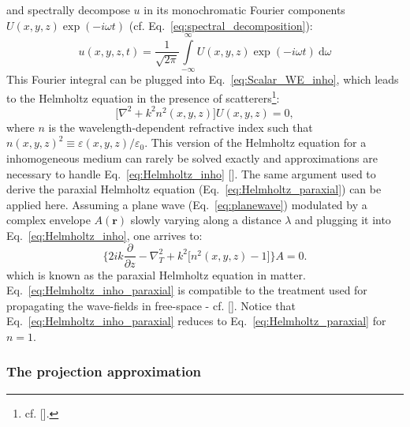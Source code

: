\begin{refsection}
\begin{equation}
\end{equation}
and spectrally decompose $u$ in its monochromatic Fourier components $U(x,y,z)\exp{(-i\omega t)}$ (cf. Eq.~\ref{eq:spectral_decomposition}):
\begin{equation*}
    u(x,y,z,t)=\frac{1}{\sqrt{2\pi}}\int\limits_{-\infty}^\infty{U(x,y,z)\exp{(-i\omega t)}~\mathrm{d}\omega}
\end{equation*}
This Fourier integral can be plugged into Eq.~\ref{eq:Scalar_WE_inho}, which leads to the Helmholtz equation in the presence of scatterers\footnote{cf. [\cite[\textit{Eq.~2.28}]{Paganin2006}].}:
\begin{equation}\label{eq:Helmholtz_inho}
    \big[\nabla^2 + k^2n^2(x,y,z)\big]U(x,y,z) = 0,
\end{equation}{}
where $n$ is the wavelength-dependent refractive index such that $n(x,y,z)^2\equiv\varepsilon(x,y,z)/\varepsilon_0$. This version of the Helmholtz equation for a inhomogeneous medium can rarely be solved exactly and approximations are necessary to handle Eq.~\ref{eq:Helmholtz_inho} [\cite[\textit{§2.1}]{Paganin2006}]. The same argument used to derive the paraxial Helmholtz equation (Eq.~\ref{eq:Helmholtz_paraxial}) can be applied here. Assuming a plane wave (Eq.~\ref{eq:planewave}) modulated by a complex envelope $A(\textbf{r})$ slowly varying along a distance $\lambda$ and plugging it into Eq.~\ref{eq:Helmholtz_inho}, one arrives to:
\begin{equation}\label{eq:Helmholtz_inho_paraxial}
    \Bigg\{2ik\frac{\partial}{\partial z}-\nabla^2_T+k^2\big[n^2(x,y,z)-1\big]\Bigg\}A=0.
\end{equation}{}
which is known as the paraxial Helmholtz equation in matter. Eq.~\ref{eq:Helmholtz_inho_paraxial} is compatible to the treatment used for propagating the wave-fields in free-space - cf. [\cite[\textit{Eq.~2.33}]{Paganin2006}]. Notice that Eq.~\ref{eq:Helmholtz_inho_paraxial} reduces to Eq.~\ref{eq:Helmholtz_paraxial} for $n=1$.

\subsubsection*{The projection approximation}


\end{refsection}
